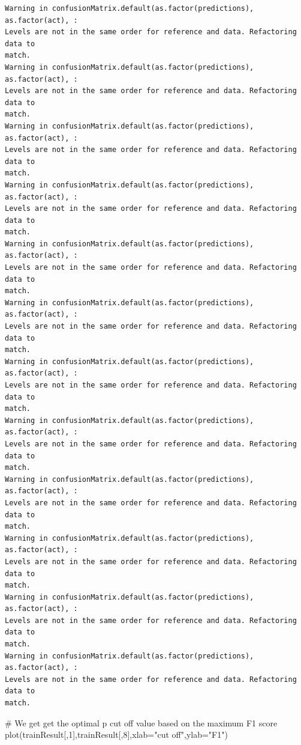 \documentclass[
  letterpaper,
  DIV=11,
  numbers=noendperiod]{scrartcl}
\newenvironment{Shaded}{\begin{snugshade}}{\end{snugshade}}
\newcommand{\AttributeTok}[1]{\textcolor[rgb]{0.40,0.45,0.13}{#1}}
\newcommand{\CommentTok}[1]{\textcolor[rgb]{0.37,0.37,0.37}{#1}}
\newcommand{\DecValTok}[1]{\textcolor[rgb]{0.68,0.00,0.00}{#1}}
\newcommand{\FunctionTok}[1]{\textcolor[rgb]{0.28,0.35,0.67}{#1}}
\newcommand{\NormalTok}[1]{\textcolor[rgb]{0.00,0.23,0.31}{#1}}
\newcommand{\StringTok}[1]{\textcolor[rgb]{0.13,0.47,0.30}{#1}}
\begin{document}
\begin{verbatim}
Warning in confusionMatrix.default(as.factor(predictions), as.factor(act), :
Levels are not in the same order for reference and data. Refactoring data to
match.
Warning in confusionMatrix.default(as.factor(predictions), as.factor(act), :
Levels are not in the same order for reference and data. Refactoring data to
match.
Warning in confusionMatrix.default(as.factor(predictions), as.factor(act), :
Levels are not in the same order for reference and data. Refactoring data to
match.
Warning in confusionMatrix.default(as.factor(predictions), as.factor(act), :
Levels are not in the same order for reference and data. Refactoring data to
match.
Warning in confusionMatrix.default(as.factor(predictions), as.factor(act), :
Levels are not in the same order for reference and data. Refactoring data to
match.
Warning in confusionMatrix.default(as.factor(predictions), as.factor(act), :
Levels are not in the same order for reference and data. Refactoring data to
match.
Warning in confusionMatrix.default(as.factor(predictions), as.factor(act), :
Levels are not in the same order for reference and data. Refactoring data to
match.
Warning in confusionMatrix.default(as.factor(predictions), as.factor(act), :
Levels are not in the same order for reference and data. Refactoring data to
match.
Warning in confusionMatrix.default(as.factor(predictions), as.factor(act), :
Levels are not in the same order for reference and data. Refactoring data to
match.
Warning in confusionMatrix.default(as.factor(predictions), as.factor(act), :
Levels are not in the same order for reference and data. Refactoring data to
match.
Warning in confusionMatrix.default(as.factor(predictions), as.factor(act), :
Levels are not in the same order for reference and data. Refactoring data to
match.
Warning in confusionMatrix.default(as.factor(predictions), as.factor(act), :
Levels are not in the same order for reference and data. Refactoring data to
match.
\end{verbatim}

\begin{Shaded}
\begin{Highlighting}[]
\CommentTok{\# We get get the optimal p cut off value based on the maximum F1 score}
\FunctionTok{plot}\NormalTok{(trainResult[,}\DecValTok{1}\NormalTok{],trainResult[,}\DecValTok{8}\NormalTok{],}\AttributeTok{xlab=}\StringTok{"cut off"}\NormalTok{,}\AttributeTok{ylab=}\StringTok{"F1"}\NormalTok{)}
\end{Highlighting}
\end{Shaded}
\end{document}
